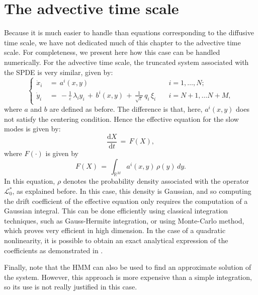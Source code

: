 \section{The advective time scale}
\label{sec:the_advective_time_scale}
Because it is much easier to handle than equations corresponding to the
diffusive time scale, we have not dedicated much of this chapter to the
advective time scale. For completeness, we present here how this case can be
handled numerically. For the advective time scale, the truncated system
associated with the SPDE is very similar, given by:
\begin{equation}
    \left\{\begin{aligned} 
            \dot x_{i}\,&=\,a^{i}(x,y)
            & \quad i = 1,{\dots}, N;  \\ \dot y_{i}\,&=\,-\frac 1 {{\varepsilon}}\, {\lambda}_{i}
            y_{i}\,+\,b^{i}(x,y)\,+\,\frac 1{\sqrt {\varepsilon}}\,q_{i}\,{\xi}_{i} &
            \quad i = N+1, {\dots}N+M,
        \end{aligned} \right. 
\end{equation}
where $a$ and $b$ are defined as before. The difference is that, here,
$a^i(x,y)$ does not satisfy the centering condition. Hence the effective
equation for the slow modes is given by:
$$
\frac{\mathrm d X}{\mathrm d t}\,=\, F(X),
$$
where $F({\cdot})$ is given by
$$
F(X) \,=\, \int_{\mathbb R^M} a^i(x,y) \, {\rho}(y)\,dy.
$$
In this equation, ${\rho}$ denotes the probability density associated with the
operator $\mathcal L_0^*$, as explained before. In this case, this density is
Gaussian, and so computing the drift coefficient of the effective equation only
requires the computation of a Gaussian integral. This can be done efficiently
using classical integration techniques, such as Gauss-Hermite integration, or
using Monte-Carlo method, which proves very efficient in high dimension. In the case of 
a quadratic nonlinearity, it is possible to obtain an exact analytical
expression of the coefficients as demonstrated in \cite{abdulle2012numerical}.

Finally, note that the HMM can also be used to find an approximate solution of
the system. However, this approach is more expensive than a simple integration, so its 
use is not really justified in this case. 


